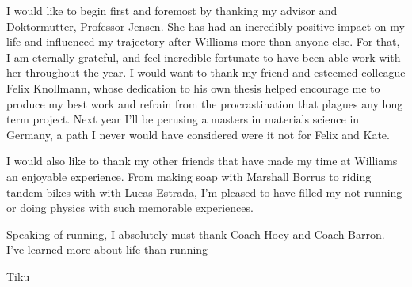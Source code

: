
I would like to begin first and foremost by thanking my advisor and Doktormutter, Professor Jensen. She has had an incredibly positive impact on my life and influenced my trajectory after Williams more than anyone else. For that, I am eternally grateful, and feel incredible fortunate to have been able work with her throughout the year. I would want to thank my friend and esteemed colleague Felix Knollmann, whose dedication to his own thesis helped encourage me to produce my best work and refrain from the procrastination that plagues any long term project. Next year I'll be perusing a masters in materials science in Germany, a path I never would have considered were it not for Felix and Kate. 

I would also like to thank my other friends that have made my time at Williams an enjoyable experience. From making soap with Marshall Borrus to riding tandem bikes with with Lucas Estrada, I'm pleased to have filled my not running or doing physics with such memorable experiences. 

Speaking of running, I absolutely must thank Coach Hoey and Coach Barron. I've learned more about life than running 

Tiku



